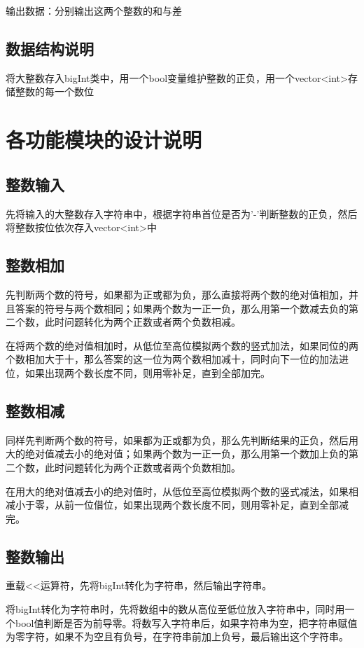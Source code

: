 \documentclass{ctexart}
\begin{document}
    输出数据：分别输出这两个整数的和与差
    \subsection{数据结构说明}
    将大整数存入bigInt类中，用一个bool变量维护整数的正负，用一个vector<int>存储整数的每一个数位
    
    \section{各功能模块的设计说明}
    \subsection{整数输入}
    先将输入的大整数存入字符串中，根据字符串首位是否为'-'判断整数的正负，然后将整数按位依次存入vector<int>中
    
    \subsection{整数相加}
    先判断两个数的符号，如果都为正或都为负，那么直接将两个数的绝对值相加，并且答案的符号与两个数相同；如果两个数为一正一负，那么用第一个数减去负的第二个数，此时问题转化为两个正数或者两个负数相减。
    
    在将两个数的绝对值相加时，从低位至高位模拟两个数的竖式加法，如果同位的两个数相加大于十，那么答案的这一位为两个数相加减十，同时向下一位的加法进位，如果出现两个数长度不同，则用零补足，直到全部加完。
    
    \subsection{整数相减}
    同样先判断两个数的符号，如果都为正或都为负，那么先判断结果的正负，然后用大的绝对值减去小的绝对值；如果两个数为一正一负，那么用第一个数加上负的第二个数，此时问题转化为两个正数或者两个负数相加。
    
    在用大的绝对值减去小的绝对值时，从低位至高位模拟两个数的竖式减法，如果相减小于零，从前一位借位，如果出现两个数长度不同，则用零补足，直到全部减完。
    
    \subsection{整数输出}
    重载<<运算符，先将bigInt转化为字符串，然后输出字符串。
    
    将bigInt转化为字符串时，先将数组中的数从高位至低位放入字符串中，同时用一个bool值判断是否为前导零。将数写入字符串后，如果字符串为空，把字符串赋值为零字符，如果不为空且有负号，在字符串前加上负号，最后输出这个字符串。
    
\end{document}
